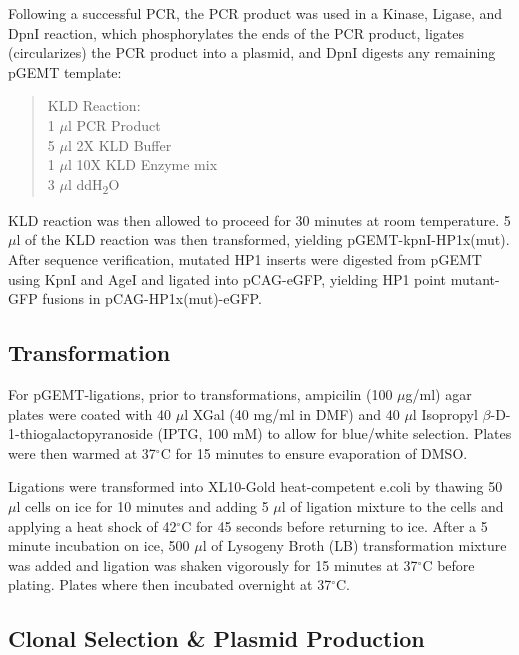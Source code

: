 \documentclass[onehalf,12pt]{beavtex}
\begin{document}
  Following a successful PCR, the PCR product was used in a Kinase,
  Ligase, and DpnI reaction, which phosphorylates the ends of the PCR
  product, ligates (circularizes) the PCR product into a plasmid, and DpnI
  digests any remaining pGEMT template:
  
  \begin{quote}
  KLD Reaction:\\
  1 \(\mu\)l PCR Product\\
  5 \(\mu\)l 2X KLD Buffer\\
  1 \(\mu\)l 10X KLD Enzyme mix\\
  3 \(\mu\)l ddH\textsubscript{2}O
  \end{quote}
  
  KLD reaction was then allowed to proceed for 30 minutes at room
  temperature. 5 \(\mu\)l of the KLD reaction was then transformed,
  yielding pGEMT-kpnI-HP1x(mut). After sequence verification, mutated HP1
  inserts were digested from pGEMT using KpnI and AgeI and ligated into
  pCAG-eGFP, yielding HP1 point mutant-GFP fusions in pCAG-HP1x(mut)-eGFP.
  \FloatBarrier
  
  \subsection{Transformation}\label{transformation}
  
  For pGEMT-ligations, prior to transformations, ampicilin (100
  \(\mu\)g/ml) agar plates were coated with 40 \(\mu\)l XGal (40 mg/ml in
  DMF) and 40 \(\mu\)l Isopropyl \(\beta\)-D-1-thiogalactopyranoside
  (IPTG, 100 mM) to allow for blue/white selection. Plates were then
  warmed at 37\(^\circ\)C for 15 minutes to ensure evaporation of DMSO.
  
  Ligations were transformed into XL10-Gold heat-competent e.coli by
  thawing 50 \(\mu\)l cells on ice for 10 minutes and adding 5 \(\mu\)l of
  ligation mixture to the cells and applying a heat shock of 42\(^\circ\)C
  for 45 seconds before returning to ice. After a 5 minute incubation on
  ice, 500 \(\mu\)l of Lysogeny Broth (LB) transformation mixture was
  added and ligation was shaken vigorously for 15 minutes at 37\(^\circ\)C
  before plating. Plates where then incubated overnight at 37\(^\circ\)C.
  
  \subsection{Clonal Selection \& Plasmid
  Production}\label{clonal-selection-plasmid-production}
  
\end{document}
